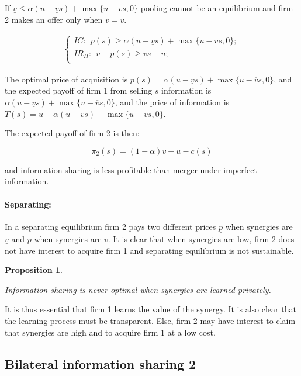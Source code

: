 \documentclass[a4paper,leqno]{article}%
\newtheorem{prop}{Proposition}
\renewcommand{\a}{\alpha}
\newcommand{\uv}{\underline{v}}
\newcommand{\ov}{\overline{v}}
\newcommand{\up}{\underline{p}}
\newcommand{\op}{\overline{p}}
\begin{document}
If $\uv\leq \a(u-\uv s)+\max\{u-\ov s,0\}$ pooling cannot be an equilibrium and firm 2 makes an offer only when $v=\ov$. 

\begin{align}
\begin{cases}
    IC:~~ p(s)\geq \a(u-\uv s)+\max\{u-\ov s,0\};\\ 
    IR_H:~~ \ov -p(s)\geq \ov s-u;\\ 
\end{cases}
\end{align}

The optimal price of acquisition is $p(s)=\a(u-\uv s)+\max\{u-\ov s,0\}$, and the expected payoff of firm 1 from selling $s$ information is $\a(u-\uv s)+\max\{u-\ov s,0\}$, and the price of information is $T(s)=u-\a(u-\uv s)-\max\{u-\ov s,0\}$.


The expected payoff of firm 2 is then:

\[
\pi_2(s)=(1-\a) \ov-u-c(s)
\]

and information sharing is less profitable than merger under imperfect information.



\paragraph{Separating:}

\medskip  

In a separating equilibrium firm 2 pays two different prices $\up$ when synergies are $\uv$ and $\op$ when synergies are $\ov$. It is clear that when synergies are low, firm 2 does not have interest to acquire firm 1 and separating equilibrium is not sustainable.

\medskip

\begin{prop}~~

Information sharing is never optimal when synergies are learned privately.

\end{prop}

It is thus essential that firm 1 learns the value of the synergy. It is also clear that the learning process must be transparent. Else, firm 2 may have interest to claim that synergies are high and to acquire firm 1 at a low cost.



\subsection{Bilateral information sharing 2}
\end{document}
